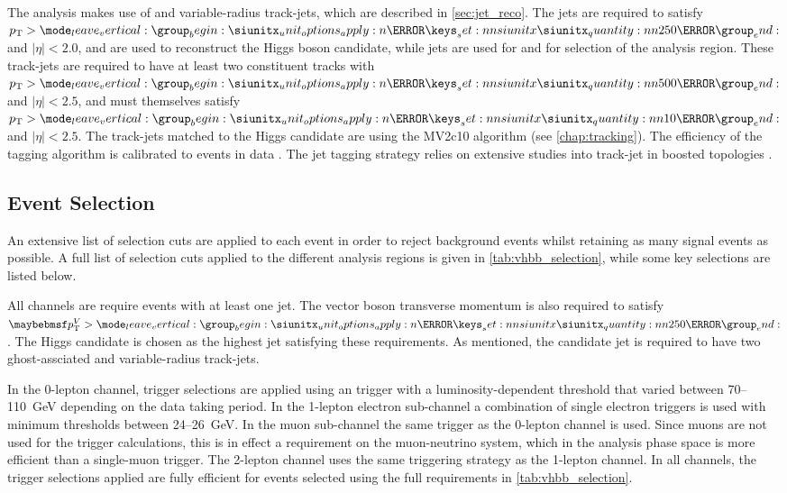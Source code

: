 The analysis makes use of \largeR and variable-radius \smallR track-jets, which are described in \cref{sec:jet_reco}.
The \largeR jets are required to satisfy $\pt > \SI{250}{\GeV}$ and $|\eta| < 2.0$, and are used to reconstruct the Higgs boson candidate, while \smallR jets are used for \btagging and for selection of the analysis region.
These track-jets are required to have at least two constituent tracks with $\pt > \SI{500}{\MeV}$ and $|\eta| < 2.5$, and must themselves satisfy $\pt > \SI{10}{\GeV}$ and $|\eta| < 2.5$.
The track-jets matched to the Higgs candidate are \btagged using the MV2c10 \btagging algorithm (see \cref{chap:tracking}).
The efficiency of the tagging algorithm is calibrated to events in data \cite{PERF-2016-05,ATLAS-CONF-2018-006,ATLAS-CONF-2018-001}.
The jet tagging strategy relies on extensive studies into track-jet \btagging in boosted topologies \cite{ATL-PHYS-PUB-2014-013, PERF-2017-04}.



\subsection{Event Selection}\label{sec:vhbb_selections}

An extensive list of selection cuts are applied to each event in order to reject background events whilst retaining as many signal events as possible. 
A full list of selection cuts applied to the different analysis regions is given in \cref{tab:vhbb_selection}, while some key selections are listed below.

All channels are require events with at least one \largeR jet.
The vector boson transverse momentum is also required to satisfy $\ptv > \SI{250}{\GeV}$.
The Higgs candidate is chosen as the highest \pt \largeR jet satisfying these requirements.
As mentioned, the candidate \largeR jet is required to have two ghost-assciated and \btagged variable-radius track-jets.

In the 0-lepton channel, trigger selections are applied using an \ETmiss trigger with a luminosity-dependent threshold that varied between 70--\SI{110}{\GeV} depending on the data taking period.
In the 1-lepton electron sub-channel a combination of single electron triggers is used with minimum \pt thresholds between 24--\SI{26}{\GeV}.
In the muon sub-channel the same \ETmiss trigger as the 0-lepton channel is used.
Since muons are not used for the \ETmiss trigger calculations, this is in effect a \pt requirement on the muon-neutrino system, which in the analysis phase space is more efficient than a single-muon trigger.
The 2-lepton channel uses the same triggering strategy as the 1-lepton channel.
In all channels, the trigger selections applied are fully efficient for events selected using the full requirements in \cref{tab:vhbb_selection}.

